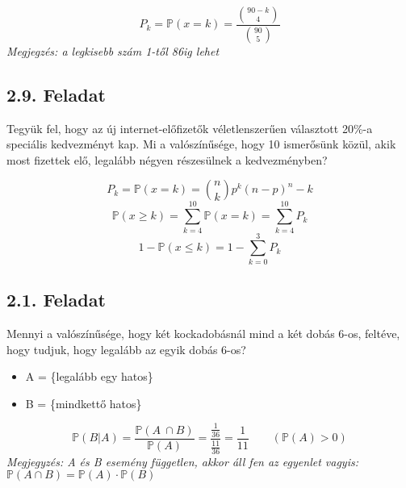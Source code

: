 \documentclass{article}
\begin{document}
\[ P_k =  \mathbb{P}(x=k) = \frac{\binom{90-k}{4}}{\binom{90}{5}}\]
\textit{Megjegzés: a legkisebb szám 1-től 86ig lehet}


\subsection*{2.9. Feladat}
Tegyük fel, hogy az új internet-előfizetők véletlenszerűen választott 20\%-a speciális kedvezményt kap. Mi a
valószínűsége, hogy 10 ismerősünk közül, akik most fizettek elő, legalább négyen részesülnek a kedvezményben?

\[ P_k = \mathbb{P}(x=k) = \binom{n}{k} p^k (n-p)^n-k \]
\[ \mathbb{P}(x \geq k) = \sum_{k=4}^{10} {\mathbb{P}(x=k)} =\sum_{k=4}^{10} {P_k}  \]
\[ 1 - \mathbb{P}(x \leq k) = 1 - \sum_{k=0}^{3} {P_k}  \]


\subsection*{2.1. Feladat}
Mennyi a valószínűsége, hogy két kockadobásnál mind a két dobás 6-os, feltéve, hogy tudjuk, hogy legalább az
egyik dobás 6-os?

\begin{itemize}
    \item A = \{legalább egy hatos\}
    \item B = \{mindkettő hatos\}
\end{itemize}
\[ \mathbb{P}(B|A) = \frac{\mathbb{P}(A \ \cap B)}{\mathbb{P}(A)} = \frac{\frac{1}{36}}{\frac{11}{36}} = \frac{1}{11} \quad \quad (\mathbb{P}(A) > 0)\] 
\textit{Megjegyzés: A és B esemény független, akkor áll fen az egyenlet vagyis: $\mathbb{P}(A \cap B) = \mathbb{P}(A) \cdot \mathbb{P}(B)$}
\end{document}
